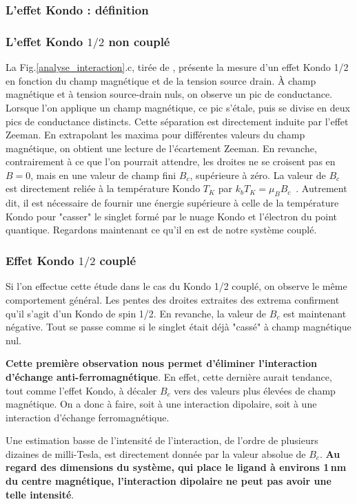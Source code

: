 \subsubsection{L'effet Kondo : définition}


\subsubsection{L'effet Kondo $1/2$ non couplé}
La Fig.\ref{analyse_interaction}.c, tirée de \cite{Roch2009}, présente la mesure d'un effet Kondo 1/2 en fonction du champ magnétique et de la tension source drain. \`A champ magnétique et  à tension source-drain nuls, on observe un pic de conductance. Lorsque l'on applique un champ magnétique, ce pic s'étale, puis se divise en deux pics de conductance distincts. Cette séparation est directement induite par l'effet Zeeman. En extrapolant les maxima pour différentes valeurs du champ magnétique, on obtient une lecture de l'écartement Zeeman. En revanche, contrairement à ce que l'on pourrait attendre, les droites ne se croisent pas en $B=0$, mais en une valeur de champ fini $B_c$, supérieure à zéro. La valeur de $B_c$ est directement reliée à la température Kondo $T_K$ par $k_bT_K = \mu_B B_c$~\cite{Roch2009}. Autrement dit, il est nécessaire de fournir une énergie supérieure à celle de la température Kondo pour "casser" le singlet formé par le nuage Kondo et l'électron du point quantique. Regardons maintenant ce qu'il en est de notre système couplé.

\subsubsection{Effet Kondo $1/2$ couplé} 
Si l'on effectue cette étude dans le cas du Kondo 1/2 couplé, on observe le même comportement général. Les pentes des droites extraites des extrema confirment qu'il s'agit d'un Kondo de spin 1/2. En revanche, la valeur de $B_c$ est maintenant négative. Tout se passe comme si le singlet était déjà "cassé" à champ magnétique nul. 

\textbf{Cette première observation nous permet d'éliminer l'interaction d'échange anti-ferromagnétique}. En effet, cette dernière aurait tendance, tout comme l'effet Kondo, à décaler $B_c$ vers des valeurs plus élevées de champ magnétique. On a donc à faire, soit à une interaction dipolaire, soit à une interaction d'échange ferromagnétique.

Une estimation basse de l'intensité de l'interaction, de l'ordre de plusieurs dizaines de milli-Tesla, est directement donnée par la valeur absolue de $B_c$. \textbf{Au regard des dimensions du système, qui place le ligand à environs 1\,nm du centre magnétique, l'interaction dipolaire ne peut pas avoir une telle intensité}. 

